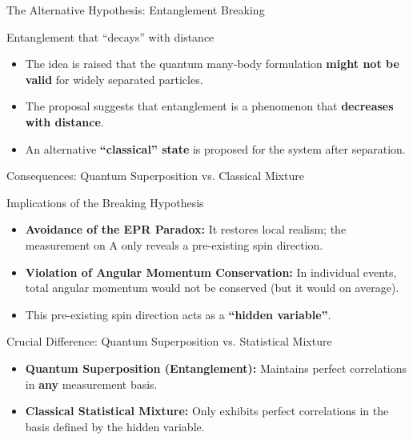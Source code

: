 \begin{frame}{The Alternative Hypothesis: Entanglement Breaking}

  \begin{block}{Entanglement that ``decays'' with distance}
    \begin{itemize}[<+->]
      \item The idea is raised that the quantum many-body formulation \textbf{might not be valid} for widely separated particles.
      \item The proposal suggests that entanglement is a phenomenon that \textbf{decreases with distance}.
      \item An alternative \textbf{``classical'' state} is proposed for the system after separation.
    \end{itemize}
  \end{block}

\end{frame}

\begin{frame}{Consequences: Quantum Superposition vs. Classical Mixture}

  \begin{block}{Implications of the Breaking Hypothesis}
    \begin{itemize}[<+->]
      \item \textbf{Avoidance of the EPR Paradox:} It restores local realism; the measurement on A only reveals a pre-existing spin direction.
      \item \textbf{Violation of Angular Momentum Conservation:} In individual events, total angular momentum would not be conserved (but it would on average).
      \item This pre-existing spin direction acts as a \textbf{``hidden variable''}.
    \end{itemize}
  \end{block}

  \begin{alertblock}{Crucial Difference: Quantum Superposition vs. Statistical Mixture}
    \begin{itemize}[<+->]
      \item \textbf{Quantum Superposition (Entanglement):} Maintains perfect correlations in \textbf{any} measurement basis.
      \item \textbf{Classical Statistical Mixture:} Only exhibits perfect correlations in the basis defined by the hidden variable.
    \end{itemize}
  \end{alertblock}

\end{frame}

